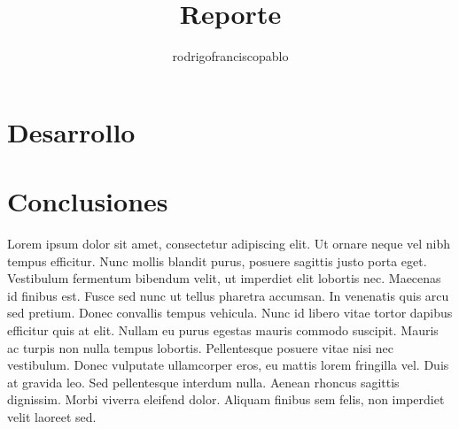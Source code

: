 \documentclass{mylib/reporteConCalif}
\title{Reporte}
\author{rodrigofranciscopablo }
\begin{document}
\coverPage


\section*{Desarrollo}

\subsection{}

\section*{Conclusiones}

Lorem ipsum dolor sit amet, consectetur adipiscing elit. Ut ornare neque vel nibh tempus efficitur. Nunc mollis blandit purus, posuere sagittis justo porta eget.\\

Vestibulum fermentum bibendum velit, ut imperdiet elit lobortis nec. Maecenas id finibus est. Fusce sed nunc ut tellus pharetra accumsan. In venenatis quis arcu sed pretium. Donec convallis tempus vehicula. Nunc id libero vitae tortor dapibus efficitur quis at elit. Nullam eu purus egestas mauris commodo suscipit. Mauris ac turpis non nulla tempus lobortis. Pellentesque posuere vitae nisi nec vestibulum. Donec vulputate ullamcorper eros, eu mattis lorem fringilla vel. Duis at gravida leo. Sed pellentesque interdum nulla. Aenean rhoncus sagittis dignissim. Morbi viverra eleifend dolor. Aliquam finibus sem felis, non imperdiet velit laoreet sed.
\end{document}
